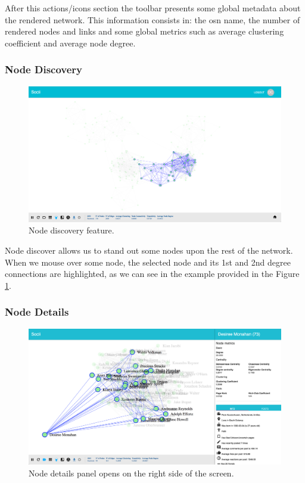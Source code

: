 \indent After this actions/icons section the toolbar presents some global metadata about the rendered network. This information consists in: the \gls{osn} name, the number of rendered nodes and links and some global metrics such as average clustering coefficient and average node degree.

\clearpage
\subsubsection{Node Discovery}

\begin{figure}[h!]
\begin{center}
  \hspace*{-0.8in}
  \includegraphics[width=1.2\textwidth]{img/socii/socii_5.png}
\end{center}
\caption{\label{img:socii_5} Node discovery feature.}
\end{figure}

Node discover allows us to stand out some nodes upon the rest of the network. When we mouse over some node, the selected node and its 1st and 2nd degree connections are highlighted, as we can see in the example provided in the Figure \ref{img:socii_5}.

\subsubsection{Node Details}

\begin{figure}[h!]
\begin{center}
  \hspace*{-0.8in}
  \includegraphics[width=1.2\textwidth]{img/socii/socii_6_v2.png}
\end{center}
\caption{\label{img:socii_6} Node details panel opens on the right side of the screen.}
\end{figure}

